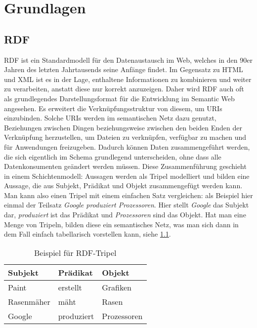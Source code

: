 \documentclass[headsepline,titlepage,ngerman,twoside,12pt]{report}
\newcommand\todo[1]{}%
\begin{document}
\chapter{Grundlagen }
\todo{
Erklären Sie alle fachlichen Grundlagen, die notwendig sind, um der Bearbeitung Ihres Seminar­themas folgen zu können.
Beachten Sie, dass die Darstellung für den durchschnittlichen Vorlesungs­hörer verständlich ist.
}
\section{RDF}
\ac{RDF} ist ein Standardmodell für den Datenaustausch im Web, welches in den 90er Jahren des letzten Jahrtausends seine Anfänge findet. Im Gegensatz zu \ac{HTML} und \ac{XML} ist es in der Lage, enthaltene Informationen zu kombinieren und weiter zu verarbeiten, anstatt diese nur korrekt anzuzeigen. Daher wird RDF auch oft als grundlegendes Darstellungsformat für die Entwicklung im Semantic Web angesehen.
Es erweitert die Verknüpfungsstruktur von diesem, um \ac{URIs} einzubinden.
Solche URIs werden im semantischen Netz dazu genutzt, Beziehungen zwischen Dingen beziehungsweise zwischen den beiden Enden der Verknüpfung herzustellen, um Dateien zu verknüpfen, verfügbar zu machen und für Anwendungen freizugeben. Dadurch können Daten zusammengeführt werden, die sich eigentlich im Schema grundlegend unterscheiden, ohne dass alle Datenkonsumenten geändert werden müssen. Diese Zusammenführung geschieht in einem Schichtenmodell: Aussagen werden als Tripel modelliert und bilden eine Aussage, die aus Subjekt, Prädikat und Objekt zusammengefügt werden kann. Man kann also einen Tripel mit einem einfachen Satz vergleichen: als Beispiel hier einmal der Teilsatz \textit{Google produziert Prozessoren}. Hier stellt \textit{Google} das Subjekt dar, \textit{produziert} ist das Prädikat und \textit{Prozessoren} sind das Objekt. Hat man eine Menge von Tripeln, bilden diese ein semantisches Netz, was man sich dann in dem Fall einfach tabellarisch vorstellen kann, siehe \cref{tab:rdfexample}.

\begin{table}
\begin{centering}
\begin{tabularx}{\textwidth}{XXX}
\toprule
\textrm{Subjekt}			&\textrm{Prädikat}			&\textrm{Objekt}\\
\midrule
Paint					&erstellt				&Grafiken\\
Rasenmäher				&mäht					&Rasen\\
Google					&produziert				&Prozessoren\\
\bottomrule
\end{tabularx}
\end{centering}
\caption{Beispiel für RDF-Tripel}
\label{tab:rdfexample}
\end{table}
\end{document}
